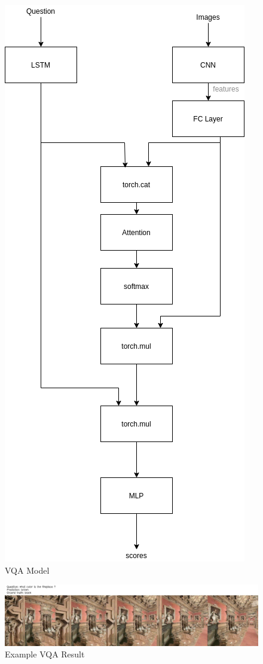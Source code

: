 \begin{figure}[H]
     \centering
     \includegraphics[width=.5\textwidth]{./figure/baseline_diagram.png}
     \caption{VQA Model}
     \label{fig:baseline_model}
\end{figure}

\begin{figure}[H]
	\centering
        \includegraphics[width=\textwidth]{./figure/results/baseline_and_blindfolding/images/ckpt_23_781_image.jpg}
	\caption{Example VQA Result} %
	\label{fig:example_vqa_result}
\end{figure}

